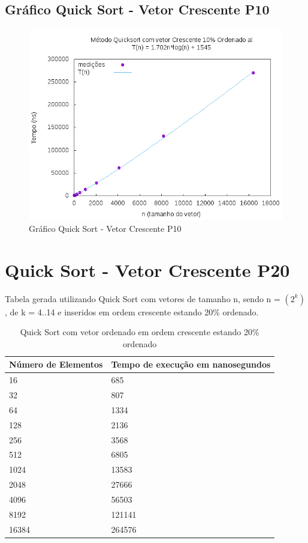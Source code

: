 \documentclass[12pt,a4paper,twoside]{report}
\begin{document}
\subsection{Gráfico Quick Sort - Vetor Crescente P10}
\begin{figure}[H]
    \centering
    \includegraphics[width=0.7\linewidth]{graficos/QuickSort/vIntCrescenteP10/vIntCrescenteP10.png}
  \caption{Gráfico Quick Sort - Vetor Crescente P10}
\end{figure}

\section{Quick Sort - Vetor Crescente P20}
Tabela gerada utilizando Quick Sort com vetores de tamanho n, sendo n = $(2^k)$, de k = 4..14 e inseridos em ordem crescente estando 20\% ordenado.
\begin{table}[H]
\centering
\caption{Quick Sort com vetor ordenado em ordem crescente estando 20\% ordenado}
\label{my-label}
\begin{tabular}{|l|l|}
\hline
\multicolumn{1}{|c|}{\textbf{Número de Elementos}} & \multicolumn{1}{c|}{\textbf{Tempo de execução em nanosegundos}} \\ \hline
16 & 685 \\ \hline
32 & 807 \\ \hline
64 & 1334 \\ \hline
128 & 2136 \\ \hline
256 & 3568 \\ \hline
512 & 6805 \\ \hline
1024 & 13583 \\ \hline
2048 & 27666 \\ \hline
4096 & 56503 \\ \hline
8192 & 121141 \\ \hline
16384 & 264576 \\ \hline
\end{tabular}
\end{table}
\end{document}
